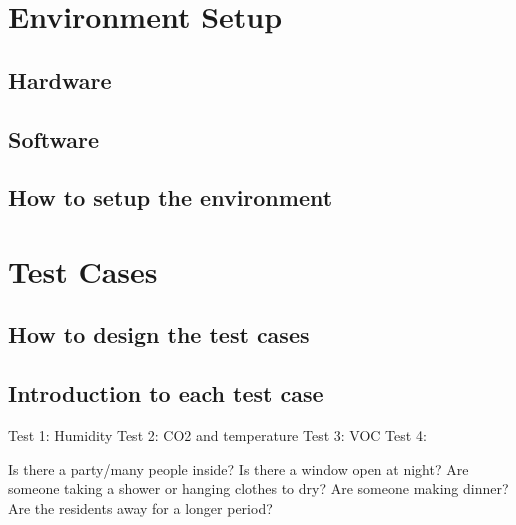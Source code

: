 \section{Environment Setup}
\subsection{Hardware}
\subsection{Software}
\subsection{How to setup the environment}

\section{Test Cases}
\subsection{How to design the test cases}
\subsection{Introduction to each test case}

Test 1: Humidity
Test 2: CO2 and temperature
Test 3: VOC
Test 4: 

Is there a party/many people inside?
Is there a window open at night?
Are someone taking a shower or hanging clothes to dry?
Are someone making dinner?
Are the residents away for a longer period?
